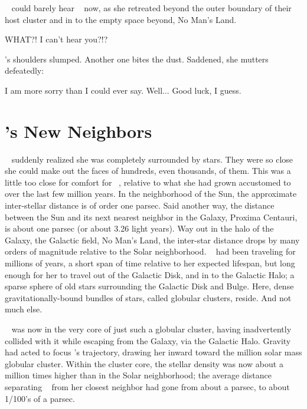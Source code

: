 \documentclass[main.tex]{subfiles}
\begin{document}
\par \nar \rmsterope~ could barely hear \rmlouise~ now, as she retreated beyond the outer boundary of their host cluster and in to the empty space beyond, No Man's Land.

\par \Sterope WHAT?! I can't hear you?!?

\par \nar \rmsterope's shoulders slumped.  Another one bites the dust.  Saddened, she mutters defeatedly:

\par \Sterope I am more sorry than I could ever say.  Well... Good luck, I guess.  

\section{\rmsterope's New Neighbors}

\par \nar \rmsterope~ suddenly realized she was completely surrounded by stars.  They were so close she could make out the faces of hundreds, even thousands, of them.  This was a little too close for comfort for \rmsterope~, relative to what she had grown accustomed to over the last few million years.  In the neighborhood of the Sun, the approximate inter-stellar distance is of order one parsec.  Said another way, the distance between the Sun and its next nearest neighbor in the Galaxy, Proxima Centauri, is about one parsec (or about 3.26 light years).  Way out in the halo of the Galaxy, the Galactic field, No Man's Land, the inter-star distance drops by many orders of magnitude relative to the Solar neighborhood.  \rmsterope~ had been traveling for millions of years, a short span of time relative to her expected lifespan, but long enough for her to travel out of the Galactic Disk, and in to the Galactic Halo; a sparse sphere of old stars surrounding the Galactic Disk and Bulge.  Here, dense gravitationally-bound bundles of stars, called globular clusters, reside.  And not much else.

\par \nar \rmsterope~ was now in the very core of just such a globular cluster, having inadvertently collided with it while escaping from the Galaxy, via the Galactic Halo.  Gravity had acted to focus \rmsterope's trajectory, drawing her inward toward the million solar mass globular cluster.  Within the cluster core, the stellar density was now about a million times higher than in the Solar neighborhood; the average distance separating \rmsterope~ from her closest neighbor had gone from about a parsec, to about 1/100's of a parsec.  
\end{document}
